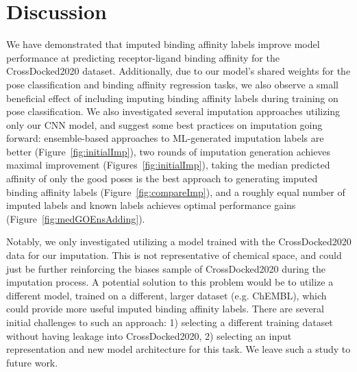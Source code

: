 \documentclass[journal=jmcmar,manuscript=article]{achemso}
\begin{document}
\section{Discussion}
We have demonstrated that imputed binding affinity labels improve model performance at predicting receptor-ligand binding affinity for the CrossDocked2020 dataset.
Additionally, due to our model's shared weights for the pose classification and binding affinity regression tasks, we also observe a small beneficial effect of including imputing binding affinity labels during training on pose classification.
We also investigated several imputation approaches utilizing only our CNN model, and suggest some best practices on imputation going forward: ensemble-based approaches to ML-generated imputation labels are better (Figure~\ref{fig:initialImp}), two rounds of imputation generation achieves maximal improvement (Figures~\ref{fig:initialImp}), taking the median predicted affinity of only the good poses is the best approach to generating imputed binding affinity labels (Figure~\ref{fig:compareImp}), and a roughly equal number of imputed labels and known labels achieves optimal performance gains (Figure~\ref{fig:medGOEnsAdding}).

Notably, we only investigated utilizing a model trained with the CrossDocked2020 data for our imputation.
This is not representative of chemical space, and could just be further reinforcing the biases sample of CrossDocked2020 during the imputation process.
A potential solution to this problem would be to utilize a different model, trained on a different, larger dataset (e.g. ChEMBL\cite{Chembl}), which could provide more useful imputed binding affinity labels.
There are several initial challenges to such an approach: 1) selecting a different training dataset without having leakage into CrossDocked2020, 2) selecting an input representation and new model architecture for this task.
We leave such a study to future work.
\end{document}

